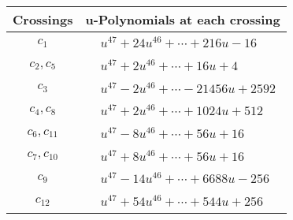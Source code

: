 \documentclass[1p]{elsarticle_modified}
\theoremstyle{definition}
\begin{document}
\begin{tabular}{m{50pt}|m{274pt}}
Crossings & \hspace{64pt}u-Polynomials at each crossing \\
\hline $$\begin{aligned}c_{1}\end{aligned}$$&$\begin{aligned}
&u^{47}+24 u^{46}+\cdots+216 u-16
\end{aligned}$\\
\hline $$\begin{aligned}c_{2},c_{5}\end{aligned}$$&$\begin{aligned}
&u^{47}+2 u^{46}+\cdots+16 u+4
\end{aligned}$\\
\hline $$\begin{aligned}c_{3}\end{aligned}$$&$\begin{aligned}
&u^{47}-2 u^{46}+\cdots-21456 u+2592
\end{aligned}$\\
\hline $$\begin{aligned}c_{4},c_{8}\end{aligned}$$&$\begin{aligned}
&u^{47}+2 u^{46}+\cdots+1024 u+512
\end{aligned}$\\
\hline $$\begin{aligned}c_{6},c_{11}\end{aligned}$$&$\begin{aligned}
&u^{47}-8 u^{46}+\cdots+56 u+16
\end{aligned}$\\
\hline $$\begin{aligned}c_{7},c_{10}\end{aligned}$$&$\begin{aligned}
&u^{47}+8 u^{46}+\cdots+56 u+16
\end{aligned}$\\
\hline $$\begin{aligned}c_{9}\end{aligned}$$&$\begin{aligned}
&u^{47}-14 u^{46}+\cdots+6688 u-256
\end{aligned}$\\
\hline $$\begin{aligned}c_{12}\end{aligned}$$&$\begin{aligned}
&u^{47}+54 u^{46}+\cdots+544 u+256
\end{aligned}$\\
\hline
\end{tabular}\\~\\
\end{document}
